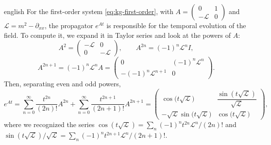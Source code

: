 \documentclass[../0000.tex]{subfiles}
\begin{document}
\begin{hyphenrules}{english}
For the first-order system \eqref{eq:kg-first-order}, with $A=\begin{pmatrix}0&1\\-\mathcal{L}&0\end{pmatrix}$
and $\mathcal{L}=m^2-\partial_{xx}$, the propagator $e^{At}$ is responsible for the temporal evolution of
the field. To compute it, we expand it in Taylor series and look at the powers of $A$:
\[
  A^2=\begin{pmatrix}-\mathcal{L} & 0\\ 0 & -\mathcal{L}\end{pmatrix},\qquad
  A^{2n}=(-1)^n\mathcal{L}^{n}I,
\]
\[
  A^{2n+1}=(-1)^n\mathcal{L}^{n}A=\begin{pmatrix}0 & (-1)^n\mathcal{L}^{n}\\ -(-1)^n\mathcal{L}^{n+1} & 0\end{pmatrix}.
\]
Then, separating even and odd powers,
\begin{equation}
  e^{At}=\sum_{n=0}^{\infty}\frac{t^{2n}}{(2n)!}A^{2n}+\sum_{n=0}^{\infty}\frac{t^{2n+1}}{(2n+1)!}A^{2n+1}
  =\begin{pmatrix}
    \cos\big(t\sqrt{\mathcal{L}}\big) & \dfrac{\sin(t\sqrt{\mathcal{L}})}{\sqrt{\mathcal{L}}}\\[2mm]
    -\sqrt{\mathcal{L}}\sin\big(t\sqrt{\mathcal{L}}\big) & \cos\big(t\sqrt{\mathcal{L}}\big)
  \end{pmatrix},
  \label{eq:app-kg-propagator}
\end{equation}
where we recognized the series
$\cos(t\sqrt{\mathcal{L}})=\sum_n(-1)^nt^{2n}\mathcal{L}^n/(2n)!$ and
$\sin(t\sqrt{\mathcal{L}})/\sqrt{\mathcal{L}}=\sum_n(-1)^nt^{2n+1}\mathcal{L}^n/(2n+1)!$.

\end{hyphenrules}

\ifSubfilesClassLoaded{}{}
\end{document}
